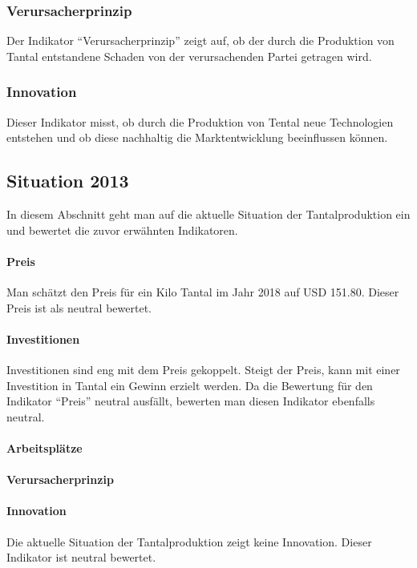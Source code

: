 \subsubsection{Verursacherprinzip}
Der Indikator ``Verursacherprinzip'' zeigt auf, ob der durch die Produktion von
Tantal entstandene Schaden von der verursachenden Partei getragen wird.

\subsubsection{Innovation}
Dieser Indikator misst, ob durch die Produktion von Tental neue Technologien
entstehen und ob diese nachhaltig die Marktentwicklung beeinflussen können.

\subsection{Situation 2013}
In diesem Abschnitt geht man auf die aktuelle Situation der Tantalproduktion ein
und bewertet die zuvor erwähnten Indikatoren.

\paragraph{Preis}
Man schätzt den Preis für ein Kilo Tantal im Jahr 2018 auf USD
151.80.\cite{tantal_price} Dieser Preis ist als neutral bewertet.

\paragraph{Investitionen}
Investitionen sind eng mit dem Preis gekoppelt. Steigt der Preis, kann mit einer
Investition in Tantal ein Gewinn erzielt werden. Da die Bewertung für den
Indikator ``Preis'' neutral ausfällt, bewerten man diesen Indikator ebenfalls
neutral.

\paragraph{Arbeitsplätze}

\paragraph{Verursacherprinzip}

\paragraph{Innovation}
Die aktuelle Situation der Tantalproduktion zeigt keine Innovation. Dieser
Indikator ist neutral bewertet.

